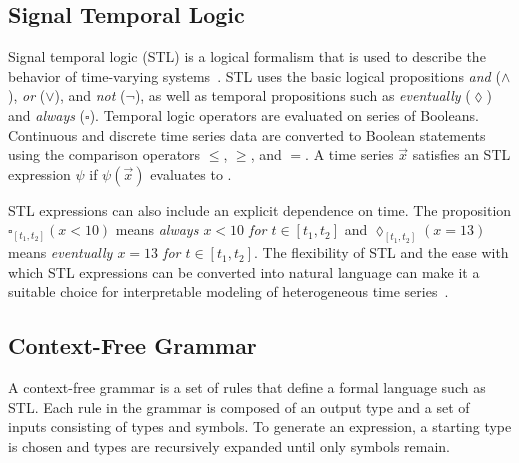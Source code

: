 \subsection{Signal Temporal Logic}
\label{subsec:stl}
Signal temporal logic (STL) is a logical formalism that is used to describe the behavior of time-varying systems~\cite{maler2004monitoring,baier2008principles}. STL uses the basic logical propositions \emph{and} ($\land$), \emph{or} ($\lor$), and \emph{not} ($\neg$), as well as temporal propositions such as \emph{eventually} ($\lozenge$) and \emph{always} ($\square$). 
%     
Temporal logic operators are evaluated on series of Booleans. Continuous and discrete time series data are converted to Boolean statements using the comparison operators $\leq$, $\geq$, and $=$. A time series $\vec{x}$ satisfies an STL expression $\psi$ if $\psi(\vec{x})$ evaluates to \True{}.

STL expressions can also include an explicit dependence on time. The proposition $\square_{[t_1, t_2]} (x < 10)$ means \emph{always $x < 10$ for $t\in [t_1, t_2]$} and $\lozenge_{[t_1, t_2]}(x = 13)$ means \emph{eventually $x = 13$ for $t\in [t_1, t_2]$}. The flexibility of STL and the ease with which STL expressions can be converted into natural language can make it a suitable choice for interpretable modeling of heterogeneous time series~\cite{lee2018interpretable,vazquez2017logical}.


\subsection{Context-Free Grammar}
\label{subsec:cfg}

A context-free grammar is a set of rules that define a formal language such as STL.  Each rule in the grammar is composed of an output type and a set of inputs consisting of types and symbols. To generate an expression, a starting type is chosen and types are recursively expanded until only symbols remain. 

